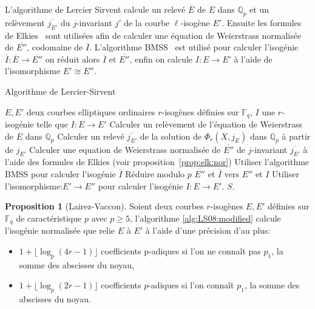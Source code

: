 \documentclass[10pt,a4paper]{book}
\theoremstyle{plain}
\theoremstyle{definition}
\theoremstyle{definition}
\theoremstyle{definition}
\theoremstyle{definition}
\newtheorem{prop}[thm]{Proposition}
\theoremstyle{definition}
\theoremstyle{remark}
\theoremstyle{remark}
\theoremstyle{definition}
\begin{document}
L'algorithme de Lercier Sirvent calcule un relevé $\overline{E}$ de $E$ dans 
$\mathbb{Q}_p$ et un relèvement $\overline{j_{E'}}$ du $j$-invariant $j'$ de la
courbe $\ell$-isogène $E'$. Ensuite les formules de Elkies~\cite{Elkies1998} sont utilisées afin  de calculer une équation de Weierstrass normalisée de $\overline{E''}$, codomaine de $\overline{I}$. L'algorithme BMSS~\cite{BMSS08} est utilisé pour calculer l'isogénie $\overline{I}:\overline{E} \rightarrow \overline{E''}$ on réduit alors $\overline{I}$ et $\overline{E''}$, enfin on calcule $I: E \rightarrow E' $ à l'aide de l'isomorphisme $E' \cong E''$. 

\begin{algorithm}
\caption{\label{alg:LS08:modified} Algorithme de Lercier-Sirvent}
\begin{algorithmic}[1]
\REQUIRE $E,E'$ deux courbes elliptiques ordinaires $r$-isogènes définies sur $\mathbb{F}_q$,%
\ENSURE $I$ une $r$-isogénie telle que $I:E \rightarrow E'$
\STATE Calculer un relèvement de l'équation de Weierstrass de $E$ dans $\mathbb{Q}_p$
\STATE \label{alg:LS08:modified:rel:polmod} Calculer un relevé $\overline{j_{E'}}$ de la solution de $\Phi_{r}(X,j_E)$ dans $\mathbb{Q}_p$ à partir de $j_{E'}$
\STATE Calculer une equation de Weierstrass normalisée de $\overline{E''}$ de $j$-invariant $\overline{j_{E'}}$ à l'aide des formules de Elkies (voir proposition~\ref{prop:elk:nor})
\STATE Utiliser l'algorithme BMSS pour calculer l'isogénie $\overline{I}$
\STATE Réduire modulo $p$ $\overline{E''}$ et $\overline{I}$ vers $E''$ et $I$
\STATE Utiliser l'isomorphisme:$E' \rightarrow E''$ pour calculer l'isogénie $I: E \rightarrow E'$.
\RETURN$S$. 
\end{algorithmic}
\end{algorithm}

\begin{prop}[Lairez-Vaccon]
Soient deux courbes $r$-isogènes $E,E'$ définies sur $\mathbb{F}_q$ de caractéristique $p$ avec $p \geqslant 5$, l'algorithme \ref{alg:LS08:modified} calcule l'isogénie normalisée que relie $E$ à $E'$ à l'aide d'une précision d'au plus: 
\begin{itemize}
\item $ 1 + \lfloor \log_p(4 r - 1) \rfloor $ coefficients p-adiques si l'on ne connaît pas $p_1$, la somme des abscisses du noyau,
\item  $ 1 + \lfloor \log_p(2 r - 1) \rfloor $ coefficients $p$-adiques si l'on connaît $p_1$, la somme des abscisses du noyau.
\end{itemize}
\end{prop}
\end{document}
